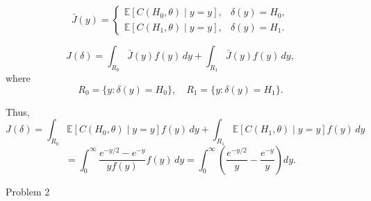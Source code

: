 \documentclass[12pt,a4paper,onecolumn]{exam}
\newcommand{\questionheader}[1]{%
  \begin{tcolorbox}[
    enhanced,
    colback=black,
    coltext=white,
    boxrule=0pt,
    fontupper=\Large\bfseries,
    arc=4mm
  ]
  #1
  \end{tcolorbox}%
}
\begin{document}
\begin{solution}
\[
\bar J(y)=
\begin{cases}
\mathbb{E}[C(H_0,\theta)\mid y=y], & \delta(y)=H_0,\\
\mathbb{E}[C(H_1,\theta)\mid y=y], & \delta(y)=H_1.
\end{cases}
\]

\[
J(\delta)=\int_{R_0}\bar J(y)f(y)\,dy+\int_{R_1}\bar J(y)f(y)\,dy,
\]
where
\[
R_0=\{y:\delta(y)=H_0\},\quad R_1=\{y:\delta(y)=H_1\}.
\]

Thus,
\[
J(\delta)=\int_{R_0}\mathbb{E}[C(H_0,\theta)\mid y=y]f(y)\,dy
+\int_{R_1}\mathbb{E}[C(H_1,\theta)\mid y=y]f(y)\,dy
\]
\[
=\int_{0}^{\infty}\frac{e^{-y/2}-e^{-y}}{y f(y)}f(y)\,dy
=\int_{0}^{\infty}\left(\frac{e^{-y/2}}{y}-\frac{e^{-y}}{y}\right)dy.
\]

\end{solution}

\questionheader{Problem 2}
\end{document}
